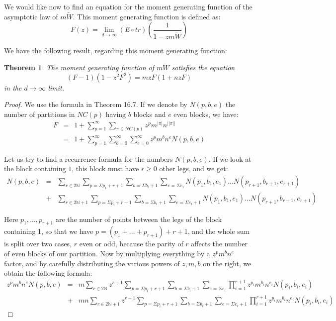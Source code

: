 \documentclass[12pt]{amsbook}
\newtheorem{theorem}{Theorem}[chapter]
\begin{document}
We would like now to find an equation for the moment generating function of the asymptotic law of $m\widetilde{W}$. This moment generating function is defined as:
$$F(z)=\lim_{d\to\infty}(E\circ tr)\left(\frac{1}{1-zm\widetilde{W}}\right)$$

We have the following result, regarding this moment generating function:

\begin{theorem}
The moment generating function of $m\widetilde{W}$ satisfies the equation
$$(F-1)(1-z^2F^2)=mzF(1+nzF)$$
in the $d\to\infty$ limit.
\end{theorem}

\begin{proof}
We use the formula in Theorem 16.7. If we denote by $N(p,b,e)$ the number of partitions in $NC(p)$ having $b$ blocks and $e$ even blocks, we have:
\begin{eqnarray*}
F
&=&1+\sum_{p=1}^\infty\sum_{\pi\in NC(p)} z^pm^{|\pi|}n^{||\pi||}\\
&=&1+\sum_{p=1}^\infty\sum_{b=0}^\infty\sum_{e=0}^\infty z^pm^bn^eN(p,b,e)
\end{eqnarray*}

Let us try to find a recurrence formula for the numbers $N(p,b,e)$. If we look at the block containing $1$, this block must have $r\geq 0$ other legs, and we get:
\begin{eqnarray*}
N(p,b,e) 
&=&\sum_{r\in 2\mathbb N}\sum_{p=\Sigma p_i+r+1}\sum_{b=\Sigma b_i+1}\sum_{e=\Sigma e_i}N(p_1,b_1,e_1)\ldots N(p_{r+1},b_{r+1},e_{r+1})\\
&+&\sum_{r\in 2\mathbb N+1}\sum_{p=\Sigma p_i+r+1}\sum_{b=\Sigma b_i+1}\sum_{e=\Sigma e_i+1}N(p_1,b_1,e_1)\ldots N(p_{r+1},b_{r+1},e_{r+1})
\end{eqnarray*}

Here $p_1,\ldots,p_{r+1}$ are the number of points between the legs of the block containing 1, so that we have $p=(p_1+\ldots+p_{r+1})+r+1$, and the whole sum is split over two cases, $r$ even or odd, because the parity of $r$ affects the number of even blocks of our partition. Now by multiplying everything by a $z^pm^bn^e$ factor, and by carefully distributing the various powers of $z,m,b$ on the right, we obtain the following formula:
\begin{eqnarray*}
z^pm^bn^eN(p,b,e)
&=&m\sum_{r\in 2\mathbb N}z^{r+1}\sum_{p=\Sigma p_i+r+1}\sum_{b=\Sigma b_i+1}\sum_{e=\Sigma e_i}\prod_{i=1}^{r+1}z^{p_i}m^{b_i}n^{e_i}N(p_i,b_i,e_i)\\
&+&mn\sum_{r\in 2\mathbb N+1}z^{r+1}\sum_{p=\Sigma p_i+r+1}\sum_{b=\Sigma b_i+1}\sum_{e=\Sigma e_i+1}\prod_{i=1}^{r+1}z^{p_i}m^{b_i}n^{e_i}N(p_i,b_i,e_i)
\end{eqnarray*}


\end{proof}
\end{document}
